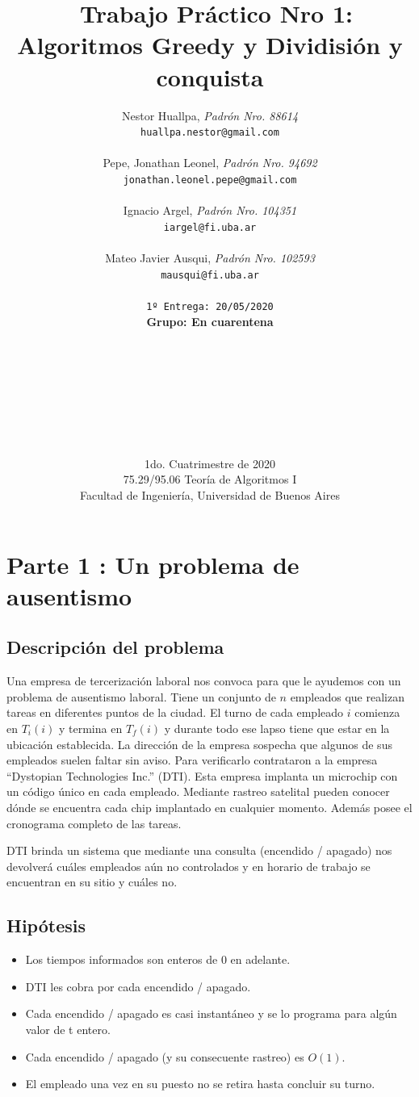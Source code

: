 \documentclass{article}
\title{	\ Trabajo Práctico Nro 1: Algoritmos Greedy y Dividisión y conquista}
\author{    Nestor Huallpa, \textit{Padrón Nro. 88614}\\
            \texttt{ huallpa.nestor@gmail.com }\\\\  
            Pepe, Jonathan Leonel, \textit{Padrón Nro. 94692}\\
            \texttt{ jonathan.leonel.pepe@gmail.com }\\\\     
            Ignacio Argel, \textit{Padrón Nro. 104351}\\
            \texttt{ iargel@fi.uba.ar }\\\\      
            Mateo Javier Ausqui, \textit{Padrón Nro. 102593}\\
            \texttt{ mausqui@fi.uba.ar }\\\\              
            \texttt{\footnotesize 1º Entrega: 20/05/2020}\\
            \textbf{Grupo: En cuarentena}
            \\\\\\\\\\\\\\\\\\
            \normalsize{1do. Cuatrimestre de 2020}\\ 
            \normalsize{75.29/95.06 Teoría de Algoritmos I} \\
            \normalsize{Facultad de Ingeniería, Universidad de Buenos Aires} \\}
\date{}
\begin{document}
\maketitle
\thispagestyle{empty}

\newpage{}
\tableofcontents

\thispagestyle{empty}

\newpage{}

\section{Parte 1 : Un problema de ausentismo}

\subsection{Descripción del problema}

Una empresa de tercerización laboral nos convoca para que le ayudemos con un problema de ausentismo laboral. 
Tiene un conjunto de \(n\) empleados que realizan tareas en diferentes puntos de la ciudad. 
El turno de cada empleado \(i\) comienza en \(T_i(i)\) y termina en \(T_f(i)\) y durante todo ese lapso tiene que estar en la ubicación establecida. 
La dirección de la empresa sospecha que algunos de sus empleados suelen faltar sin aviso. Para verificarlo contrataron a la empresa “Dystopian Technologies Inc.” (DTI). 
Esta empresa implanta un microchip con un código único en cada empleado. Mediante rastreo satelital pueden conocer dónde se encuentra cada chip implantado en cualquier momento. Además posee el cronograma completo de las tareas.

DTI brinda un sistema que mediante una consulta (encendido / apagado) nos devolverá cuáles empleados aún no controlados y en horario de trabajo se encuentran en su sitio y cuáles no.
\subsection{Hipótesis}
\begin{itemize}
    \item Los tiempos informados son enteros de 0 en adelante.
    \item DTI les cobra por cada encendido / apagado.
    \item Cada encendido / apagado es casi instantáneo y se lo programa para algún valor de t entero.
    \item Cada encendido / apagado (y su consecuente rastreo) es \(O(1)\).
    \item El empleado una vez en su puesto no se retira hasta concluir su turno.
\end{itemize}
\end{document}
